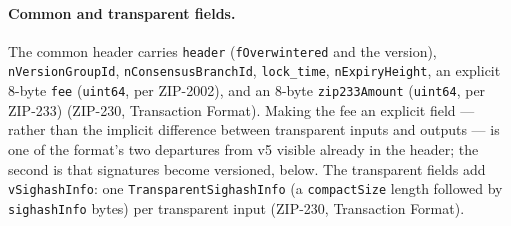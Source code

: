 \documentclass[11pt,a4paper]{article}
\theoremstyle{definition}
\begin{document}
\paragraph{Common and transparent fields.} The common header carries
\texttt{header} (\texttt{fOverwintered} and the version),
\texttt{nVersionGroupId}, \texttt{nConsensusBranchId}, \texttt{lock\_time},
\texttt{nExpiryHeight}, an
explicit 8-byte \texttt{fee} (\texttt{uint64}, per ZIP-2002), and an 8-byte
\texttt{zip233Amount} (\texttt{uint64}, per ZIP-233) (ZIP-230, Transaction
Format). Making the fee an explicit field --- rather than the implicit
difference between transparent inputs and outputs --- is one of the format's
two departures from v5 visible already in the header; the second is that
signatures become versioned, below. The transparent fields add
\texttt{vSighashInfo}: one \texttt{TransparentSighashInfo} (a
\texttt{compactSize} length followed by \texttt{sighashInfo} bytes) per
transparent input (ZIP-230, Transaction Format).
\end{document}
